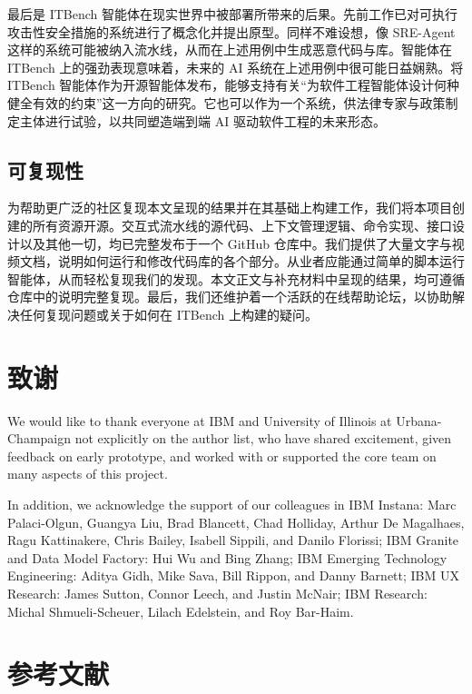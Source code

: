 \documentclass[10pt,UTF8,fontset=fandol]{ctexart}
\begin{document}
最后是 ITBench 智能体在现实世界中被部署所带来的后果。先前工作已对可执行攻击性安全措施的系统进行了概念化并提出原型。同样不难设想，像 SRE-Agent 这样的系统可能被纳入流水线，从而在上述用例中生成恶意代码与库。智能体在 ITBench 上的强劲表现意味着，未来的 AI 系统在上述用例中很可能日益娴熟。将 ITBench 智能体作为开源智能体发布，能够支持有关“为软件工程智能体设计何种健全有效的约束”这一方向的研究。它也可以作为一个系统，供法律专家与政策制定主体进行试验，以共同塑造端到端 AI 驱动软件工程的未来形态。

\subsection{可复现性}

为帮助更广泛的社区复现本文呈现的结果并在其基础上构建工作，我们将本项目创建的所有资源开源。交互式流水线的源代码、上下文管理逻辑、命令实现、接口设计以及其他一切，均已完整发布于一个 GitHub 仓库中。我们提供了大量文字与视频文档，说明如何运行和修改代码库的各个部分。从业者应能通过简单的脚本运行智能体，从而轻松复现我们的发现。本文正文与补充材料中呈现的结果，均可遵循仓库中的说明完整复现。最后，我们还维护着一个活跃的在线帮助论坛，以协助解决任何复现问题或关于如何在 ITBench 上构建的疑问。

\section*{致谢}

We would like to thank everyone at IBM and University of Illinois at Urbana-Champaign not explicitly on the author list, who have shared excitement, given feedback on early prototype, and worked with or supported the core team on many aspects of this project.

In addition, we acknowledge the support of our colleagues in IBM Instana: Marc Palaci-Olgun, Guangya Liu, Brad Blancett, Chad Holliday, Arthur De Magalhaes, Ragu Kattinakere, Chris Bailey, Isabell Sippili, and Danilo Florissi; IBM Granite and Data Model Factory: Hui Wu and Bing Zhang; IBM Emerging Technology Engineering: Aditya Gidh, Mike Sava, Bill Rippon, and Danny Barnett; IBM UX Research: James Sutton, Connor Leech, and Justin McNair; IBM Research: Michal Shmueli-Scheuer, Lilach Edelstein, and Roy Bar-Haim.
\section*{参考文献}
\end{document}
